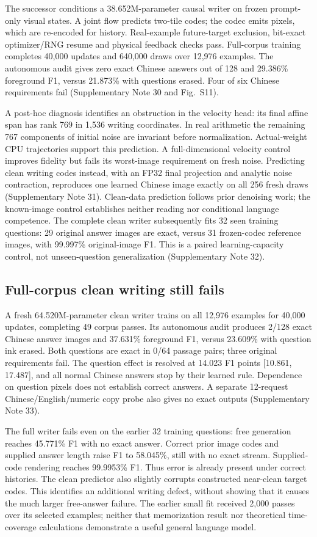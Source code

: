 \documentclass[12pt,a4paper]{article}
\begin{document}
The successor conditions a 38.652M-parameter causal writer on
frozen prompt-only visual states. A joint flow predicts two-tile codes;
the codec emits pixels, which are re-encoded for history. Real-example
future-target exclusion, bit-exact optimizer/RNG resume and physical feedback
checks pass. Full-corpus training completes 40,000 updates and 640,000 draws
over 12,976 examples. The autonomous audit gives zero exact Chinese answers
out of 128 and 29.386\% foreground F1, versus 21.873\% with questions erased.
Four of six Chinese requirements fail (Supplementary Note 30 and Fig.~S11).

A post-hoc diagnosis identifies an obstruction in the velocity head:
its final affine span has rank 769 in 1,536 writing coordinates. In real
arithmetic the remaining 767 components of initial noise are invariant
before normalization. Actual-weight CPU trajectories support this prediction.
A full-dimensional velocity control improves fidelity but fails its worst-image
requirement on fresh noise. Predicting clean writing codes instead, with an
FP32 final projection and analytic noise contraction, reproduces one learned
Chinese image exactly on all 256 fresh draws (Supplementary Note 31).
Clean-data prediction follows prior denoising work\cite{jit}; the known-image
control establishes neither reading nor conditional language competence.
The complete clean writer subsequently fits 32 seen training questions:
29 original answer images are exact, versus 31 frozen-codec reference images,
with 99.997\% original-image F1. This is a paired learning-capacity control,
not unseen-question generalization (Supplementary Note 32).

\subsection*{Full-corpus clean writing still fails}
A fresh 64.520M-parameter clean writer trains on all 12,976 examples for
40,000 updates, completing 49 corpus passes. Its autonomous audit produces
2/128 exact Chinese answer images and 37.631\% foreground F1, versus
23.609\% with question ink erased. Both questions are exact in 0/64 passage
pairs; three original requirements fail. The question effect is resolved
at 14.023 F1 points [10.861, 17.487], and all normal Chinese answers stop
by their learned rule. Dependence on question pixels does not establish
correct answers. A separate 12-request Chinese/English/numeric copy probe
also gives no exact outputs (Supplementary Note 33).

The full writer fails even on the earlier 32 training questions: free
generation reaches 45.771\% F1 with no exact answer. Correct prior image
codes and supplied answer length raise F1 to 58.045\%, still with no exact
stream. Supplied-code rendering reaches 99.9953\% F1. Thus error is already
present under correct histories. The clean predictor also slightly corrupts
constructed near-clean target codes. This identifies an additional writing
defect, without showing that it causes the much larger free-answer failure.
The earlier small fit received 2,000 passes over its selected examples;
neither that memorization result nor theoretical time-coverage calculations
demonstrate a useful general language model.
\end{document}

